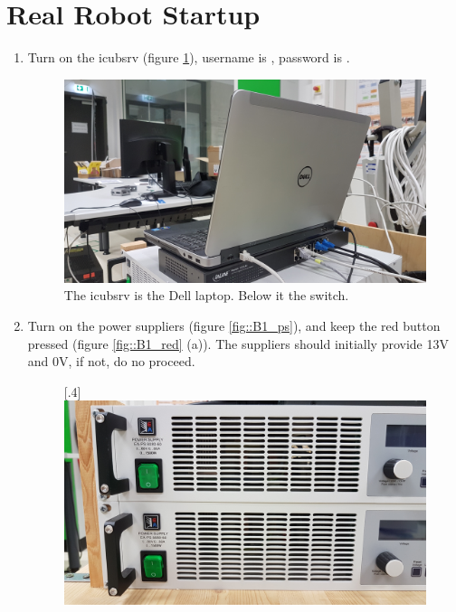 \section{Real Robot Startup}
\label{sec::B1_rr}
\begin{enumerate}
	\item Turn on the icubsrv (figure \ref{fig::B1_icubsrv}), username is , password is .
	\begin{figure}[h]
		\centering
		\includegraphics[scale=.04]{chapters/07_appendix/img/icubsrv.jpg}
		\caption{The icubsrv is the Dell laptop. Below it the switch.}
		\label{fig::B1_icubsrv}
	\end{figure}
	\item Turn on the power suppliers (figure \ref{fig::B1_ps}), and keep the red button pressed (figure \ref{fig::B1_red} (a)). The suppliers should initially provide 13V and 0V, if not, do no proceed.
	\begin{figure}[h]
		\centering
		[.4\linewidth]{\includegraphics[scale=.04]{chapters/07_appendix/img/power_supply.jpg}}

\end{figure}
\end{enumerate}
